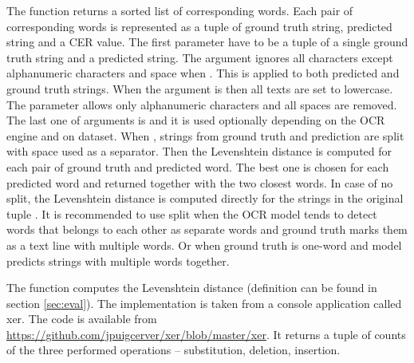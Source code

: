 The function  returns a sorted list of corresponding words. Each pair of corresponding words is represented as a tuple of ground truth string, predicted string and a CER value. The first parameter have to be a tuple of a single ground truth string and a predicted string. The argument  ignores all characters except alphanumeric characters and space when . This is applied to both predicted and ground truth strings. When the argument  is  then all texts are set to lowercase. The  parameter allows only alphanumeric characters and all spaces are removed. The last one of arguments is  and it is used optionally depending on the OCR engine and on dataset. When , strings from ground truth and prediction are split with space used as a separator. Then the Levenshtein distance is computed for each pair of ground truth and predicted word. The best one is chosen for each predicted word and returned together with the two closest words. In case of no split, the Levenshtein distance is computed directly for the strings in the original tuple . It is recommended to use split when the OCR model tends to detect words that belongs to each other as separate words and ground truth marks them as a text line with multiple words. Or when ground truth is one-word and model predicts strings with multiple words together.

The function  computes the Levenshtein distance (definition can be found in section \ref*{sec:eval}). The implementation is taken from a console application called xer. The code is available from \url{https://github.com/jpuigcerver/xer/blob/master/xer}. It returns a tuple of counts of the three performed operations --  substitution, deletion, insertion.

